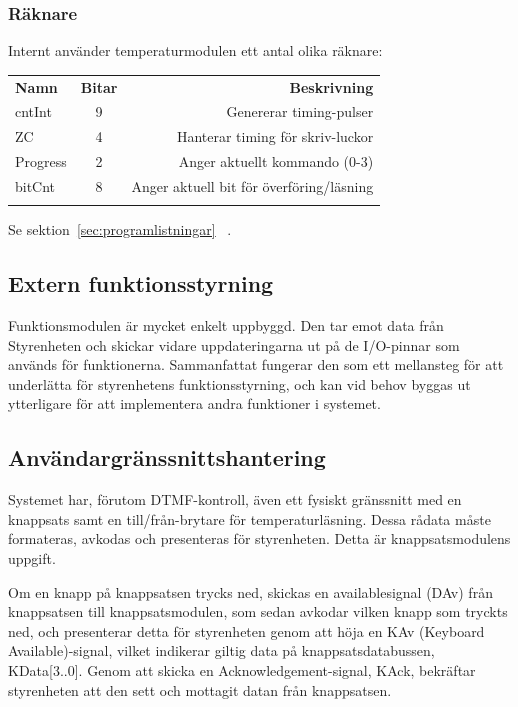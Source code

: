 \documentclass[a4paper,11pt]{article}
\begin{document}
	\subsubsection{Räknare}

	Internt använder temperaturmodulen ett antal olika räknare: \\
		\begin{tabular}{l c r}
			\\{\bf Namn} & {\bf Bitar} & {\bf Beskrivning}\\
			cntInt & 9 & Genererar timing-pulser\\
			ZC & 4 & Hanterar timing för skriv-luckor\\
			Progress & 2 & Anger aktuellt kommando (0-3)\\
			bitCnt & 8 & Anger aktuell bit för överföring/läsning\\\\
		\end{tabular}

	Se sektion~\ref{sec:programlistningar} ~.

	\subsection{Extern funktionsstyrning}

Funktionsmodulen är mycket enkelt uppbyggd. Den tar emot data från Styrenheten och skickar vidare 
uppdateringarna ut på de I/O-pinnar som används för funktionerna. Sammanfattat fungerar den som ett
mellansteg för att underlätta för styrenhetens funktionsstyrning, och kan vid behov byggas ut ytterligare
för att implementera andra funktioner i systemet.

	\subsection{Användargränssnittshantering}

Systemet har, förutom DTMF-kontroll, även ett fysiskt gränssnitt med en knappsats samt en till/från-brytare för temperaturläsning.
Dessa rådata måste formateras, avkodas och presenteras för styrenheten. Detta är knappsatsmodulens uppgift.

Om en knapp på knappsatsen trycks ned, skickas en availablesignal (DAv) från knappsatsen till knappsatsmodulen, som sedan
avkodar vilken knapp som tryckts ned, och presenterar detta för styrenheten genom att höja en KAv (Keyboard Available)-signal,
vilket indikerar giltig data på knappsatsdatabussen, KData[3..0]. Genom att skicka en Acknowledgement-signal, KAck, bekräftar 
styrenheten att den sett och mottagit datan från knappsatsen.
\end{document}
